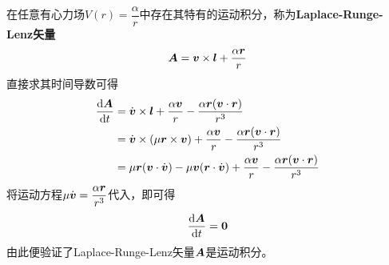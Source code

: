 在任意有心力场$V(r) = \dfrac{\alpha}{r}$中存在其特有的运动积分，称为{\bf Laplace-Runge-Lenz矢量}
\begin{equation}
	\boldsymbol{A} = \boldsymbol{v} \times \boldsymbol{l} + \frac{\alpha \boldsymbol{r}}{r}
\end{equation}
直接求其时间导数可得
\begin{align*}
	\frac{\mathrm{d}\boldsymbol{A}}{\mathrm{d}t} & = \dot{\boldsymbol{v}} \times \boldsymbol{l} + \frac{\alpha \boldsymbol{v}}{r} - \frac{\alpha \boldsymbol{r}(\boldsymbol{v}\cdot \boldsymbol{r})}{r^3} \\
	& = \dot{\boldsymbol{v}} \times (\mu \boldsymbol{r} \times \boldsymbol{v}) + \frac{\alpha \boldsymbol{v}}{r} - \frac{\alpha \boldsymbol{r}(\boldsymbol{v}\cdot \boldsymbol{r})}{r^3} \\
	& = \mu\boldsymbol{r}(\boldsymbol{v}\cdot\dot{\boldsymbol{v}}) - \mu\boldsymbol{v}(\boldsymbol{r}\cdot \dot{\boldsymbol{v}}) + \frac{\alpha \boldsymbol{v}}{r} - \frac{\alpha \boldsymbol{r}(\boldsymbol{v}\cdot \boldsymbol{r})}{r^3}
\end{align*}
将运动方程$\mu \dot{\boldsymbol{v}} = \dfrac{\alpha\boldsymbol{r}}{r^3}$代入，即可得
\begin{equation*}
	\frac{\mathrm{d}\boldsymbol{A}}{\mathrm{d}t} = \boldsymbol{0}
\end{equation*}
由此便验证了Laplace-Runge-Lenz矢量$\boldsymbol{A}$是运动积分。

